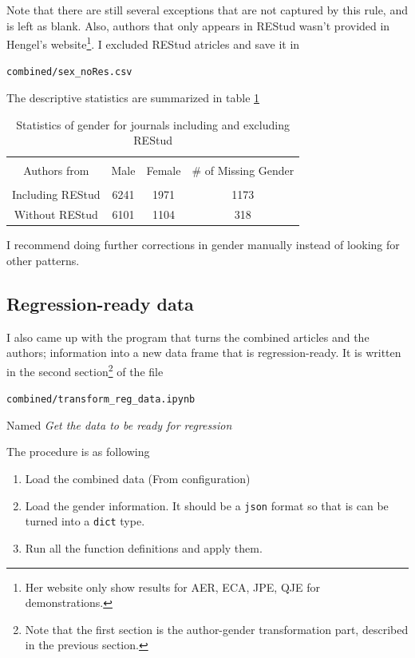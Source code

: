 Note that there are still several exceptions that are not captured by this rule, and is left as blank. Also, authors that only appears in REStud wasn't provided in Hengel's website\footnote{Her website only show results for AER, ECA, JPE, QJE for demonstrations.}. I excluded REStud atricles and save it in

\begin{center}
    \verb|combined/sex_noRes.csv|
\end{center}

The descriptive statistics are summarized in table \ref{tab:gender_miss}

\begin{table}[h]
    \centering
    \begin{tabular}{c c c c}
        \toprule \\
        Authors from & Male & Female & \# of Missing Gender \\
        \midrule \\
        Including REStud & 6241 & 1971 & 1173 \\
        Without REStud & 6101 & 1104 & 318 \\
        \bottomrule
    \end{tabular}
    \caption{Statistics of gender for journals including and excluding REStud}
    \label{tab:gender_miss}
\end{table}

I recommend doing further corrections in gender manually instead of looking for other patterns. 

\subsection{Regression-ready data}

I also came up with the program that turns the combined articles and the authors; information into a new data frame that is regression-ready. It is written in the second section\footnote{Note that the first section is the author-gender transformation part, described in the previous section.} of the file
\begin{center}
    \verb|combined/transform_reg_data.ipynb|
\end{center}
Named \emph{Get the data to be ready for regression}

The procedure is as following

\begin{enumerate}
    \item Load the combined data (From configuration)
    \item Load the gender information. It should be a \verb|json| format so that is can be turned into a \verb|dict| type. 
    \item Run all the function definitions and apply them.
\end{enumerate}



